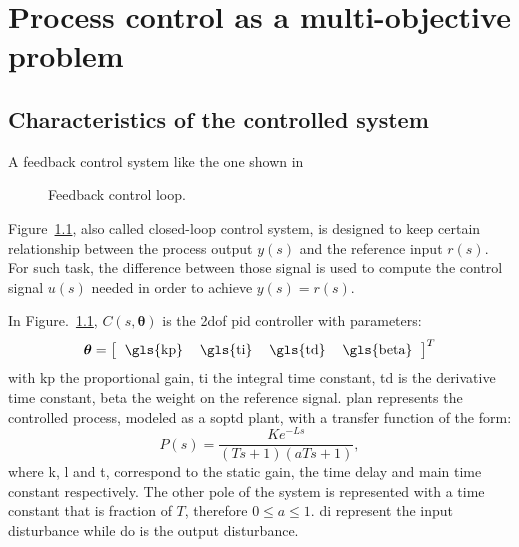 \chapter{Process control as a multi-objective problem}
\label{chap:PromContr}
\begin{refsection}
\section{Characteristics of the controlled system}
\label{sec:CaracControl}
A feedback control system like the one shown in %
\begin{figure}%
	\centering
	\caption{Feedback control loop.}%
	\label{fig:bloques}%
\end{figure}
%
Figure~\ref{fig:bloques}, also called closed-loop control system, is designed to keep certain relationship between the process output $y(s)$ and the reference input $r(s)$. For such task, the difference between those signal is used to compute the control signal $u(s)$ needed in order to achieve $y(s)=r(s)$. 

In Figure.~\ref{fig:bloques}, $C(s,\bm{\theta})$ is the \gls{2dof} \gls{pid} controller with parameters:
\begin{equation*}
\bm{\theta}=\left[	\begin{tabular}{cccc} \gls{kp} & \gls{ti} & \gls{td} & \gls{beta}	\end{tabular}\right]^T
\end{equation*}
%
with \gls{kp} the proportional gain, \gls{ti} the integral time constant, \gls{td} is the derivative time constant, \gls{beta} the weight on the reference signal. \gls{plan} represents the controlled process, modeled as a \gls{soptd} plant, with a transfer function of the form:
\begin{equation}  %
P(s) =  \frac{K e^{-Ls}}{(T s+1)(a T s+1)},
\label{eq:plantaX}
\end{equation}
%
where \gls{k}, \gls{l} and \gls{t}, correspond to the static gain, the time delay and main time constant respectively. The other pole of the system is represented with a time constant that is fraction of $T$, therefore $0 \leq a \leq 1$. \gls{di} represent the input disturbance while \gls{do} is the output disturbance.


\end{refsection}
